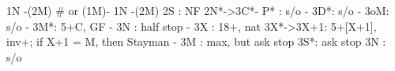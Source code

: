 1N -(2M)  # or (1M)- 1N -(2M)
2S : NF
2N*->3C*- P* : s/o
        - 3D*: s/o
        - 3oM: s/o
        - 3M*: 5+C, GF
        - 3N : half stop
   - 3X : 18+, nat
3X*->3X+1: 5+[X+1], inv+; if X+1 = M, then Stayman
         - 3M : max, but ask stop
3S*: ask stop
3N : s/o